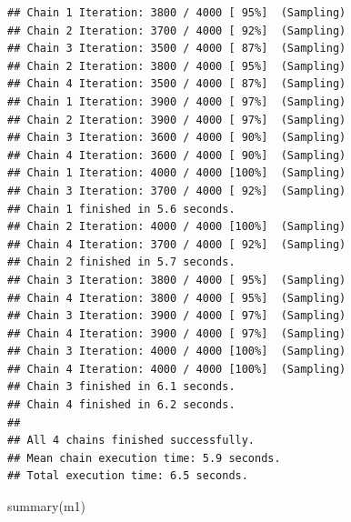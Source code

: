 \documentclass[
]{article}
\newenvironment{Shaded}{\begin{snugshade}}{\end{snugshade}}
\newcommand{\FunctionTok}[1]{\textcolor[rgb]{0.00,0.00,0.00}{#1}}
\newcommand{\NormalTok}[1]{#1}
\begin{document}
\begin{verbatim}
## Chain 1 Iteration: 3800 / 4000 [ 95%]  (Sampling) 
## Chain 2 Iteration: 3700 / 4000 [ 92%]  (Sampling) 
## Chain 3 Iteration: 3500 / 4000 [ 87%]  (Sampling) 
## Chain 2 Iteration: 3800 / 4000 [ 95%]  (Sampling) 
## Chain 4 Iteration: 3500 / 4000 [ 87%]  (Sampling) 
## Chain 1 Iteration: 3900 / 4000 [ 97%]  (Sampling) 
## Chain 2 Iteration: 3900 / 4000 [ 97%]  (Sampling) 
## Chain 3 Iteration: 3600 / 4000 [ 90%]  (Sampling) 
## Chain 4 Iteration: 3600 / 4000 [ 90%]  (Sampling) 
## Chain 1 Iteration: 4000 / 4000 [100%]  (Sampling) 
## Chain 3 Iteration: 3700 / 4000 [ 92%]  (Sampling) 
## Chain 1 finished in 5.6 seconds.
## Chain 2 Iteration: 4000 / 4000 [100%]  (Sampling) 
## Chain 4 Iteration: 3700 / 4000 [ 92%]  (Sampling) 
## Chain 2 finished in 5.7 seconds.
## Chain 3 Iteration: 3800 / 4000 [ 95%]  (Sampling) 
## Chain 4 Iteration: 3800 / 4000 [ 95%]  (Sampling) 
## Chain 3 Iteration: 3900 / 4000 [ 97%]  (Sampling) 
## Chain 4 Iteration: 3900 / 4000 [ 97%]  (Sampling) 
## Chain 3 Iteration: 4000 / 4000 [100%]  (Sampling) 
## Chain 4 Iteration: 4000 / 4000 [100%]  (Sampling) 
## Chain 3 finished in 6.1 seconds.
## Chain 4 finished in 6.2 seconds.
## 
## All 4 chains finished successfully.
## Mean chain execution time: 5.9 seconds.
## Total execution time: 6.5 seconds.
\end{verbatim}

\begin{Shaded}
\begin{Highlighting}[]
\FunctionTok{summary}\NormalTok{(m1)}
\end{Highlighting}
\end{Shaded}
\end{document}
